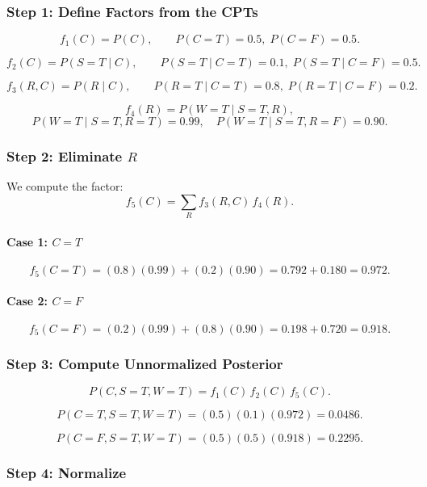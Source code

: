 \documentclass{article}
\begin{document}
\subsubsection*{Step 1: Define Factors from the CPTs}

\[
f_1(C) = P(C), \qquad
P(C=T)=0.5,\; P(C=F)=0.5.
\]

\[
f_2(C)=P(S=T\mid C), \qquad
P(S=T\mid C=T)=0.1,\; P(S=T\mid C=F)=0.5.
\]

\[
f_3(R,C)=P(R\mid C), \qquad
P(R=T\mid C=T)=0.8,\; P(R=T\mid C=F)=0.2.
\]

\[
f_4(R)=P(W=T\mid S=T,R), 
\]
\[
P(W=T\mid S=T,R=T)=0.99,\quad
P(W=T\mid S=T,R=F)=0.90.
\]

\subsubsection*{Step 2: Eliminate \(R\)}

We compute the factor:
\[
f_5(C) = \sum_{R} f_3(R,C)\,f_4(R).
\]

\paragraph{Case 1: \(C=T\)}
\[
f_5(C=T)
= (0.8)(0.99) + (0.2)(0.90)
= 0.792 + 0.180
= 0.972.
\]

\paragraph{Case 2: \(C=F\)}
\[
f_5(C=F)
= (0.2)(0.99) + (0.8)(0.90)
= 0.198 + 0.720
= 0.918.
\]

\subsubsection*{Step 3: Compute Unnormalized Posterior}

\[
P(C, S=T, W=T)
= f_1(C)\,f_2(C)\,f_5(C).
\]

\[
P(C=T, S=T, W=T)
= (0.5)(0.1)(0.972)
= 0.0486.
\]

\[
P(C=F, S=T, W=T)
= (0.5)(0.5)(0.918)
= 0.2295.
\]

\subsubsection*{Step 4: Normalize}
\end{document}
